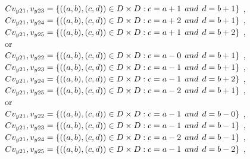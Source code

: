 \\$C{v_{y21},v_{y23}}=\{((a,b),(c,d))\in D\times D: c = a + 1\hspace{1ex} and \hspace{1ex}  d = b + 1 \}$ , 
\\$C{v_{y21},v_{y24}}=\{((a,b),(c,d))\in D\times D: c = a + 2\hspace{1ex} and \hspace{1ex}  d = b + 1 \}$ , 
\\$C{v_{y21},v_{y25}}=\{((a,b),(c,d))\in D\times D: c = a + 1\hspace{1ex} and \hspace{1ex}  d = b + 2 \}$ , 
\\or
\\$C{v_{y21},v_{y22}}=\{((a,b),(c,d))\in D\times D: c = a - 0\hspace{1ex} and \hspace{1ex}  d = b + 1 \}$ , 
\\$C{v_{y21},v_{y23}}=\{((a,b),(c,d))\in D\times D: c = a - 1\hspace{1ex} and \hspace{1ex}  d = b + 1 \}$ , 
\\$C{v_{y21},v_{y24}}=\{((a,b),(c,d))\in D\times D: c = a - 1\hspace{1ex} and \hspace{1ex}  d = b + 2 \}$ , 
\\$C{v_{y21},v_{y25}}=\{((a,b),(c,d))\in D\times D: c = a - 2\hspace{1ex} and \hspace{1ex}  d = b + 1 \}$ , 
\\or
\\$C{v_{y21},v_{y22}}=\{((a,b),(c,d))\in D\times D: c = a - 1\hspace{1ex} and \hspace{1ex}  d = b - 0 \}$ , 
\\$C{v_{y21},v_{y23}}=\{((a,b),(c,d))\in D\times D: c = a - 1\hspace{1ex} and \hspace{1ex}  d = b - 1 \}$ , 
\\$C{v_{y21},v_{y24}}=\{((a,b),(c,d))\in D\times D: c = a - 2\hspace{1ex} and \hspace{1ex}  d = b - 1 \}$ , 
\\$C{v_{y21},v_{y25}}=\{((a,b),(c,d))\in D\times D: c = a - 1\hspace{1ex} and \hspace{1ex}  d = b - 2 \}$ , 
